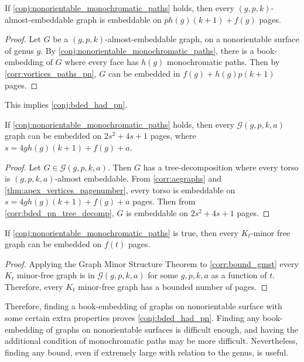 \begin{corollary}\label{corr:aegraphs}
	If \cref{conj:nonorientable_monochromatic_paths} holds, then every $(g, p, k)$-almost-embeddable graph is embeddable on $p h(g) (k + 1) + f(g)$ pages.
\end{corollary}

\begin{proof}
	Let $G$ be a $(g, p, k)$-almost-embeddable graph, on a nonorientable surface of genus $g$. By \cref{conj:nonorientable_monochromatic_paths}, there is a book-embedding of $G$ where every face has $h(g)$ monochromatic paths. Then by \cref{corr:vortices_paths_pn}, $G$ can be embedded in $f(g) + h(g) p (k+1)$ pages. 
\end{proof}

This implies \cref{conj:bded_had_pn}.
\begin{corollary}\label{corr:bound_gmst}
	If \cref{conj:nonorientable_monochromatic_paths} holds, then every $\mathcal{G}(g, p, k, a)$ graph can be embedded on $2s^2 + 4s + 1$ pages, where $s =  4g h(g) (k + 1) + f(g) + a$. 
\end{corollary}

\begin{proof}
	Let $G \in \mathcal{G}(g, p, k, a)$. Then $G$ has a tree-decomposition where every torso is $(g, p, k, a)$-almost embeddable. From \cref{corr:aegraphs} and \cref{thm:apex_vertices_pagenumber}, every torso is embeddable on $s = 4g h(g) (k + 1) + f(g) + a$ pages. Then from \cref{corr:bded_pn_tree_decomp}, $G$ is embeddable on $2s^2 + 4s + 1$ pages.
\end{proof}

\begin{corollary}
	If \cref{conj:nonorientable_monochromatic_paths} is true, then every $K_t$-minor free graph can be embedded on $f(t)$ pages. 
\end{corollary}

\begin{proof}
	Applying the Graph Minor Structure Theorem to \cref{corr:bound_gmst} every $K_t$ minor-free graph is in $\mathcal{G}(g, p, k, a)$ for some $g, p, k, a$ as a function of $t$. Therefore, every $K_t$ minor-free graph has a bounded number of pages. 
\end{proof}

Therefore, finding a book-embedding of graphs on nonorientable surface with some certain extra properties proves \cref{conj:bded_had_pn}. Finding any book-embedding of graphs on nonorientable surfaces is difficult enough, and having the additional condition of monochromatic paths may be more difficult. Nevertheless, finding any bound, even if extremely large with relation to the genus, is useful. 
